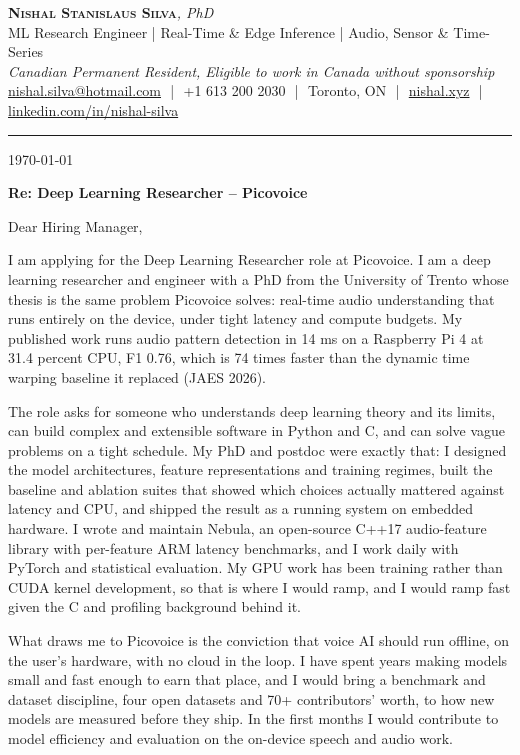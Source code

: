 \documentclass[11pt]{article}
\makeatletter
\newcommand{\clName}{Nishal Stanislaus Silva}
\newcommand{\clEmail}{nishal.silva@hotmail.com}
\newcommand{\clPhone}{+1 613 200 2030}
\newcommand{\clCity}{Toronto, ON}
\newcommand{\clSite}{https://nishal.xyz}
\newcommand{\clLinkedIn}{https://www.linkedin.com/in/nishal-silva}
\newcommand{\clStatus}{Canadian Permanent Resident, Eligible to work in Canada without sponsorship}
\newcommand{\clTagline}{ML Research Engineer | Real-Time \& Edge Inference | Audio, Sensor \& Time-Series}
\newcommand{\clRole}{Deep Learning Researcher}
\newcommand{\clCompany}{Picovoice}
\newcommand{\clAddressee}{Dear Hiring Manager,}
\makeatother
\begin{document}
\pagestyle{empty}

\begin{center}
    {\LARGE \scshape \textbf{\clName}}{\large \textit{, PhD}}
    \\[1pt]
    {\small \clTagline}
    \\[1pt]
    {\footnotesize\textit{\clStatus}}
    \\[1pt]
    {\small
    \href{mailto:\clEmail}{\clEmail}
    \,\,|\,\, \clPhone
    \,\,|\,\, \clCity
    \,\,|\,\, \href{\clSite}{nishal.xyz}
    \,\,|\,\, \href{\clLinkedIn}{linkedin.com/in/nishal-silva}}
\end{center}

\rule{\linewidth}{0.4pt}\vspace{0.6em}

\today

\textbf{Re: \clRole{} -- \clCompany{}}

\clAddressee

I am applying for the Deep Learning Researcher role at Picovoice. I am a deep learning researcher and engineer with a PhD from the University of Trento whose thesis is the same problem Picovoice solves: real-time audio understanding that runs entirely on the device, under tight latency and compute budgets. My published work runs audio pattern detection in 14 ms on a Raspberry Pi 4 at 31.4 percent CPU, F1 0.76, which is 74 times faster than the dynamic time warping baseline it replaced (JAES 2026).

The role asks for someone who understands deep learning theory and its limits, can build complex and extensible software in Python and C, and can solve vague problems on a tight schedule. My PhD and postdoc were exactly that: I designed the model architectures, feature representations and training regimes, built the baseline and ablation suites that showed which choices actually mattered against latency and CPU, and shipped the result as a running system on embedded hardware. I wrote and maintain Nebula, an open-source C++17 audio-feature library with per-feature ARM latency benchmarks, and I work daily with PyTorch and statistical evaluation. My GPU work has been training rather than CUDA kernel development, so that is where I would ramp, and I would ramp fast given the C and profiling background behind it.

What draws me to Picovoice is the conviction that voice AI should run offline, on the user's hardware, with no cloud in the loop. I have spent years making models small and fast enough to earn that place, and I would bring a benchmark and dataset discipline, four open datasets and 70+ contributors' worth, to how new models are measured before they ship. In the first months I would contribute to model efficiency and evaluation on the on-device speech and audio work.
\end{document}
